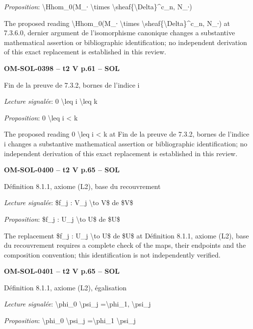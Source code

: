 \emph{Proposition}: \textbackslash{}Hhom\_0(M\_∙ \textbackslash{}times \textbackslash{}sheaf\{\textbackslash{}Delta\}\textasciicircum{}c\_n, N\_∙)\par
The proposed reading \textbackslash{}Hhom\_0(M\_∙ \textbackslash{}times \textbackslash{}sheaf\{\textbackslash{}Delta\}\textasciicircum{}c\_n, N\_∙) at 7.3.6.0, dernier argument de l'isomorphisme canonique changes a substantive mathematical assertion or bibliographic identification; no independent derivation of this exact replacement is established in this review.\par
\par\noindent\textbf{OM-SOL-0398 -- t2 V p.61 -- SOL}\par
Fin de la preuve de 7.3.2, bornes de l'indice i\par
\emph{Lecture signalée}: 0 \textbackslash{}leq i \textbackslash{}leq k\par
\emph{Proposition}: 0 \textbackslash{}leq i < k\par
The proposed reading 0 \textbackslash{}leq i < k at Fin de la preuve de 7.3.2, bornes de l'indice i changes a substantive mathematical assertion or bibliographic identification; no independent derivation of this exact replacement is established in this review.\par
\par\noindent\textbf{OM-SOL-0400 -- t2 V p.65 -- SOL}\par
Définition 8.1.1, axiome (L2), base du recouvrement\par
\emph{Lecture signalée}: \$f\_j : V\_j \textbackslash{}to V\$ de \$V\$\par
\emph{Proposition}: \$f\_j : U\_j \textbackslash{}to U\$ de \$U\$\par
The replacement \$f\_j : U\_j \textbackslash{}to U\$ de \$U\$ at Définition 8.1.1, axiome (L2), base du recouvrement requires a complete check of the maps, their endpoints and the composition convention; this identification is not independently verified.\par
\par\noindent\textbf{OM-SOL-0401 -- t2 V p.65 -- SOL}\par
Définition 8.1.1, axiome (L2), égalisation\par
\emph{Lecture signalée}: \textbackslash{}phi\_0 \textbackslash{}psi\_j =\allowbreak  \textbackslash{}phi\_1, \textbackslash{}psi\_j\par
\emph{Proposition}: \textbackslash{}phi\_0 \textbackslash{}psi\_j =\allowbreak  \textbackslash{}phi\_1 \textbackslash{}psi\_j\par
